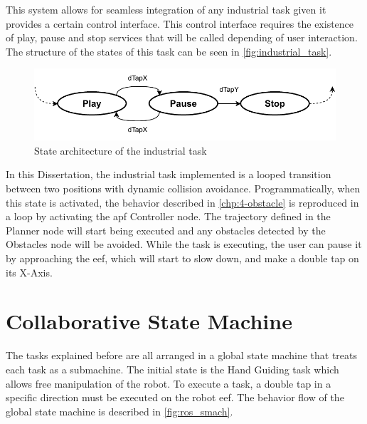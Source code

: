 \par This system allows for seamless integration of any industrial task given it provides a certain control interface. This control interface requires the existence of play, pause and stop services that will be called depending of user interaction. The structure of the states of this task can be seen in \autoref{fig:industrial_task}.

\begin{figure}[h]
    \centering
    \includegraphics[width=0.7\linewidth]{figs/chp5/industrial_task.pdf}
    \caption{State architecture of the industrial task}
    \label{fig:industrial_task}
\end{figure}

\par In this Dissertation, the industrial task implemented is a looped transition between two positions with dynamic collision avoidance. Programmatically, when this state is activated, the behavior described in \autoref{chp:4-obstacle} is reproduced in a loop by activating the \ac{apf} Controller node. The trajectory defined in the Planner node will start being executed and any obstacles detected by the Obstacles node will be avoided. While the task is executing, the user can pause it by approaching the \ac{eef}, which will start to slow down, and make a double tap on its X-Axis.





\section{Collaborative State Machine}


\par The tasks explained before are all arranged in a global state machine that treats each task as a submachine. The initial state is the Hand Guiding task which allows free manipulation of the robot. To execute a task, a double tap in a specific direction must be executed on the robot \ac{eef}. The behavior flow of the global state machine is described in \autoref{fig:ros_smach}.

